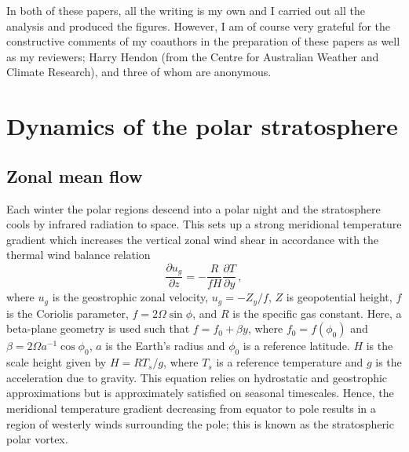 In both of these papers, all the writing is my own and I carried out all the
analysis and produced the figures. However, I am of course very grateful for the
constructive comments of my coauthors in the preparation of these papers as well
as my reviewers; Harry Hendon (from the Centre for Australian Weather and
Climate Research), and three of whom are anonymous.



\section{Dynamics of the polar stratosphere}

\subsection{Zonal mean flow}

Each winter the polar regions descend into a polar night and the stratosphere
cools by infrared radiation to space. This sets up a strong meridional
temperature gradient which increases the vertical zonal wind shear in accordance
with the thermal wind balance relation
\begin{equation}
\frac{\partial u_g}{\partial z} = -\frac{R}{fH}\frac{\partial T}{\partial y} \,, 
\end{equation} 
where $u_g$ is the geostrophic zonal velocity, $u_g = -Z_y/f$, $Z$ is
geopotential height, $f$ is the Coriolis parameter, $f=2\Omega\sin\phi$, and $R$
is the specific gas constant. Here, a beta-plane geometry is used such that
$f=f_0+\beta y$, where $f_0=f(\phi_0)$ and $\beta = 2\Omega a^{-1}\cos\phi_0$,
$a$ is the Earth's radius and $\phi_{0}$ is a reference latitude. $H$ is the
scale height given by $H = RT_s/g$, where $T_s$ is a reference temperature and
$g$ is the acceleration due to gravity. This equation relies on hydrostatic and
geostrophic approximations but is approximately satisfied on seasonal
timescales. Hence, the meridional temperature gradient decreasing from equator
to pole results in a region of westerly winds surrounding the pole; this is
known as the stratospheric polar vortex.

